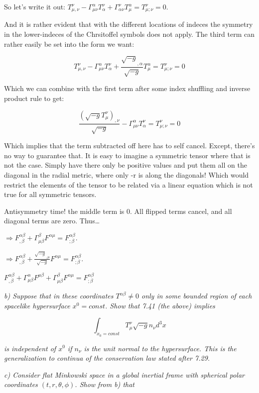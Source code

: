 \documentclass[landscape,letterpaper,10pt,english]{article}
\begin{document}
So let's write it out:
\(T^{\nu}_{\mu,\nu} - \Gamma^\alpha_{\mu\nu}T^\nu_\alpha + \Gamma^\nu_{\alpha\nu}T^\alpha_{\mu} = T^{\nu}_{\mu;\nu} = 0\).

    And it is rather evident that with the different locations of indeces
the symmetry in the lower-indeces of the Chrsitoffel symbols does not
apply. The third term can rather easily be set into the form we want:

\[T^{\nu}_{\mu,\nu} - \Gamma^\alpha_{\mu\nu}T^\nu_\alpha + \frac{\sqrt{-g}_{,\alpha}}{\sqrt{-g}}T^\alpha_{\mu} = T^{\nu}_{\mu;\nu} = 0\]

Which we can combine with the first term after some index shuffling and
inverse product rule to get:

\[ \frac{(\sqrt{-g}T^\nu_\mu)_{,\nu}}{\sqrt{-g}} - \Gamma^\alpha_{\mu\nu}T^\nu_\alpha = T^{\nu}_{\mu;\nu} = 0\]

    Which implies that the term subtracted off here has to self cancel.
Except, there's no way to guarantee that. It is easy to imagine a
symmetric tensor where that is not the case. Simply have there only be
positive values and put them all on the diagonal in the radial metric,
where only -r is along the diagonals! Which would restrict the elements
of the tensor to be related via a linear equation which is not true for
all symmetric tensors.

    Antisymmetry time! the middle term is 0. All flipped terms cancel, and
all diagonal terms are zero. Thus\ldots{}

\(\Rightarrow F^{\alpha\beta}_{,\beta} + \Gamma^\beta_{\mu\beta}F^{\alpha\mu} = F^{\alpha\beta}_{;\beta}\).

\(\Rightarrow F^{\alpha\beta}_{,\beta} + \frac{\sqrt{-g}_{,\mu}}{\sqrt{-g}}F^{\alpha\mu} = F^{\alpha\beta}_{;\beta}\).

\(F^{\alpha\beta}_{,\beta} + \Gamma^\alpha_{\mu\beta}F^{\mu\beta} + \Gamma^\beta_{\mu\beta}F^{\alpha\mu} = F^{\alpha\beta}_{;\beta}\)

    \emph{b) Suppose that in these coordinates \(T^{\alpha\beta}\neq 0\)
only in some bounded region of each spacelike hypersurface
\(x^0 = const\). Show that 7.41 (the above) implies}

\[ \int_{x_0 = const} T^\nu_\mu \sqrt{-g} n_\nu d^3x \]

\emph{is independent of \(x^0\) if \(n_\nu\) is the unit normal to the
hypersurface. This is the generalization to continua of the conservation
law stated after 7.29.}

    \emph{c) Consider flat Minkowski space in a global inertial frame with
spherical polar coordinates \((t,r,\theta,\phi)\). Show from b) that}
\end{document}
